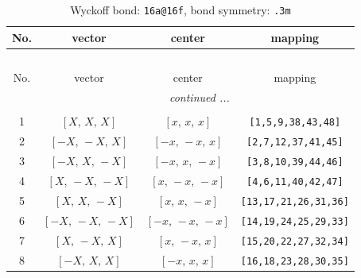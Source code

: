 \documentclass[fleqn,8pt]{jsarticle}
\begin{document}
\begin{longtable}{cccc}
\caption{Wyckoff bond: {\tt 16a@16f}, bond symmetry: {\tt .3m}}
 \\
 \hline \hline
No. & vector & center & mapping \\ \hline \endfirsthead

\multicolumn{3}{l}{\tablename\ \thetable{}} \\
 \hline \hline
No. & vector & center & mapping \\ \hline \endhead

 \hline \hline
\multicolumn{3}{r}{\footnotesize\it continued ...} \\ \endfoot

 \hline \hline
\multicolumn{3}{r}{} \\ \endlastfoot

1 & $\left[ X,\, X,\, X \right]$ & $\left[ x,\, x,\, x \right]$ & {\tt [1,5,9,38,43,48]} \\ \hline
2 & $\left[ - X,\, - X,\, X \right]$ & $\left[ - x,\, - x,\, x \right]$ & {\tt [2,7,12,37,41,45]} \\ \hline
3 & $\left[ - X,\, X,\, - X \right]$ & $\left[ - x,\, x,\, - x \right]$ & {\tt [3,8,10,39,44,46]} \\ \hline
4 & $\left[ X,\, - X,\, - X \right]$ & $\left[ x,\, - x,\, - x \right]$ & {\tt [4,6,11,40,42,47]} \\ \hline
5 & $\left[ X,\, X,\, - X \right]$ & $\left[ x,\, x,\, - x \right]$ & {\tt [13,17,21,26,31,36]} \\ \hline
6 & $\left[ - X,\, - X,\, - X \right]$ & $\left[ - x,\, - x,\, - x \right]$ & {\tt [14,19,24,25,29,33]} \\ \hline
7 & $\left[ X,\, - X,\, X \right]$ & $\left[ x,\, - x,\, x \right]$ & {\tt [15,20,22,27,32,34]} \\ \hline
8 & $\left[ - X,\, X,\, X \right]$ & $\left[ - x,\, x,\, x \right]$ & {\tt [16,18,23,28,30,35]} \\
\end{longtable}
\renewcommand{\arraystretch}{1.2}
\end{document}
